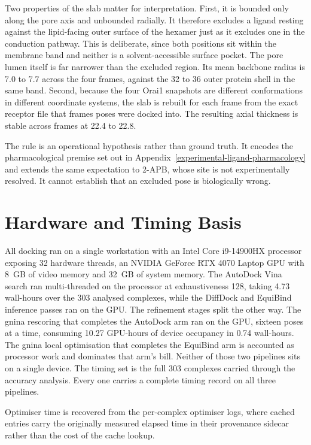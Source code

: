 Two properties of the slab matter for interpretation. First, it is bounded only along the pore axis and unbounded radially. It therefore excludes a ligand resting against the lipid-facing outer surface of the hexamer just as it excludes one in the conduction pathway. This is deliberate, since both positions sit within the membrane band and neither is a solvent-accessible surface pocket. The pore lumen itself is far narrower than the excluded region. Its mean backbone radius is 7.0 to 7.7\angstrom{} across the four frames, against the 32 to 36\angstrom{} outer protein shell in the same band. Second, because the four Orai1 snapshots are different conformations in different coordinate systems, the slab is rebuilt for each frame from the exact receptor file that frame\textquotesingle s poses were docked into. The resulting axial thickness is stable across frames at 22.4 to 22.8\angstrom{}.

The rule is an operational hypothesis rather than ground truth. It encodes the pharmacological premise set out in Appendix~\ref{experimental-ligand-pharmacology} and extends the same expectation to 2-APB, whose site is not experimentally resolved. It cannot establish that an excluded pose is biologically wrong.

\hypertarget{hardware-and-timing-basis}{%
\section{Hardware and Timing Basis}\label{hardware-and-timing-basis}}

All docking ran on a single workstation with an Intel Core i9-14900HX processor exposing 32 hardware threads, an NVIDIA GeForce RTX 4070 Laptop GPU with 8~GB of video memory and 32~GB of system memory. The AutoDock Vina search ran multi-threaded on the processor at exhaustiveness 128, taking 4.73 wall-hours over the 303 analysed complexes, while the DiffDock and EquiBind inference passes ran on the GPU. The refinement stages split the other way. The gnina rescoring that completes the AutoDock arm ran on the GPU, sixteen poses at a time, consuming 10.27 GPU-hours of device occupancy in 0.74 wall-hours. The gnina local optimisation that completes the EquiBind arm is accounted as processor work and dominates that arm's bill. Neither of those two pipelines sits on a single device. The timing set is the full 303 complexes carried through the accuracy analysis. Every one carries a complete timing record on all three pipelines.

 Optimiser time is recovered from the per-complex optimiser logs, where cached entries carry the originally measured elapsed time in their provenance sidecar rather than the cost of the cache lookup.

